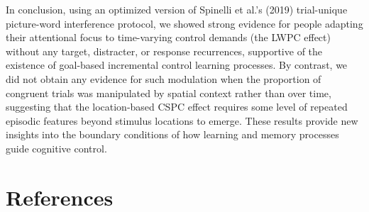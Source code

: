 \documentclass[
  ,man,floatsintext]{apa6}
\begin{document}
In conclusion, using an optimized version of Spinelli et al.'s (2019) trial-unique picture-word interference protocol, we showed strong evidence for people adapting their attentional focus to time-varying control demands (the LWPC effect) without any target, distracter, or response recurrences, supportive of the existence of goal-based incremental control learning processes. By contrast, we did not obtain any evidence for such modulation when the proportion of congruent trials was manipulated by spatial context rather than over time, suggesting that the location-based CSPC effect requires some level of repeated episodic features beyond stimulus locations to emerge. These results provide new insights into the boundary conditions of how learning and memory processes guide cognitive control.

\newpage

\hypertarget{references}{%
\section{References}\label{references}}
\end{document}
